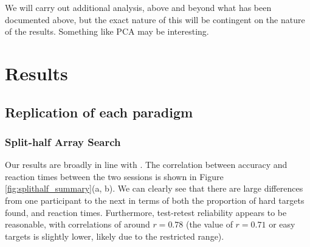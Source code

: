 \documentclass[]{rsos}%
\begin{document}
We will carry out additional analysis, above and beyond what has been documented above, but the exact nature of this will be contingent on the nature of the results. Something like PCA may be interesting. 

\section{Results}

\subsection{Replication of each paradigm}

\subsubsection{Split-half Array Search}
Our results are broadly in line with \cite{nowakowsak2017}. The correlation between accuracy and reaction times between the two sessions is shown in Figure \ref{fig:splithalf_summary}(a, b). We can clearly see that there are large differences from one participant to the next in terms of both the proportion of hard targets found, and reaction times. Furthermore, test-retest reliability appears to be reasonable, with correlations of around $r = 0.78$ (the value of $r = 0.71$ or easy targets is slightly lower, likely due to the restricted range).
\end{document}
